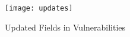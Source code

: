 \begin{figure}[h!]
\label{figure:updates}
  \centering
    \texttt{[image: updates]}
  \caption{Updated Fields in Vulnerabilities}
\end{figure}

















